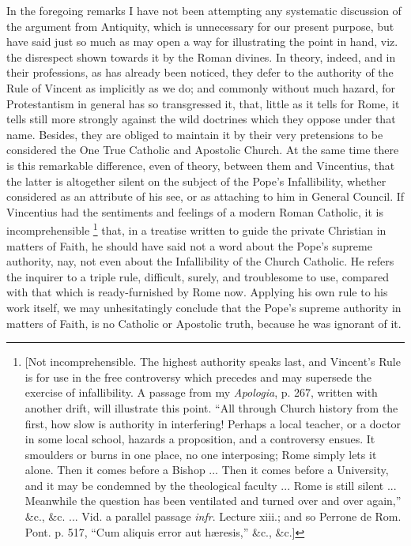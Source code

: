 In the foregoing remarks I have not been attempting any systematic
discussion of the argument from Antiquity, which is unnecessary for
our present purpose, but have said just so much as may open a way for
illustrating the point in hand, viz. the disrespect shown towards it
by the Roman divines. In theory, indeed, and in their professions, as
has already been noticed, they defer to the authority of the Rule of
Vincent as implicitly as we do; and commonly without much hazard, for
Protestantism in general has so transgressed it, that, little as it
tells for Rome, it tells still more strongly against the wild
doctrines which they oppose under that name. Besides, they are obliged
to maintain it by their very pretensions to be considered the One True
Catholic and Apostolic Church. At the same time there is this
remarkable difference, even of theory, between them and Vincentius,
that the latter is altogether silent on the subject of the Pope's
Infallibility, whether considered as an attribute of his see, or as
attaching to him in General Council. If Vincentius had the sentiments
and feelings of a modern Roman Catholic, it is incomprehensible \footnote{[Not incomprehensible. The highest authority
speaks last, and Vincent's Rule is for use in the free controversy
which precedes and may supersede the exercise of infallibility. A
passage from my \emph{Apologia}, p. 267, written with another drift, will
illustrate this point. ``All through Church history from the
first, how slow is authority in interfering! Perhaps a local teacher,
or a doctor in some local school, hazards a proposition, and a
controversy ensues. It smoulders or burns in one place, no one
interposing; Rome simply lets it alone. Then it comes before a Bishop
... Then it comes before a University, and it may be condemned by the
theological faculty ... Rome is still silent ... Meanwhile the
question has been ventilated and turned over and over again,''
\&c., \&c. ... Vid. a parallel passage \emph{infr}. Lecture
xiii.; and so Perrone de Rom. Pont. p. 517, ``Cum aliquis error
aut hæresis,'' \&c., \&c.]} that, in a treatise written to guide the private Christian
in matters of Faith, he should have said not a word about the Pope's
supreme authority, nay, not even about the Infallibility of the Church
Catholic. He refers the inquirer to a triple rule, difficult, surely,
and troublesome to use, compared with that which is ready-furnished by
Rome now. Applying his own rule to his work itself, we may
unhesitatingly conclude that the Pope's supreme authority in matters
of Faith, is no Catholic or Apostolic truth, because he was ignorant
of it.

